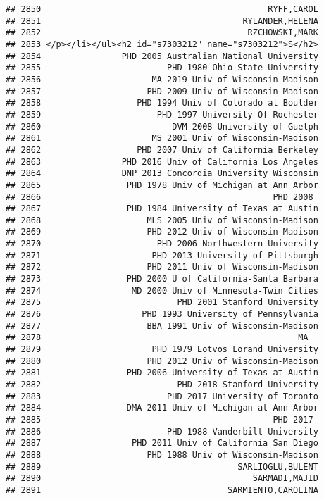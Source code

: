 \documentclass[
]{article}
\begin{document}
\begin{verbatim}
## 2850                                             RYFF,CAROL
## 2851                                        RYLANDER,HELENA
## 2852                                         RZCHOWSKI,MARK
## 2853 </p></li></ul><h2 id="s7303212" name="s7303212">S</h2>
## 2854                PHD 2005 Australian National University
## 2855                         PHD 1980 Ohio State University
## 2856                      MA 2019 Univ of Wisconsin-Madison
## 2857                     PHD 2009 Univ of Wisconsin-Madison
## 2858                   PHD 1994 Univ of Colorado at Boulder
## 2859                       PHD 1997 University Of Rochester
## 2860                          DVM 2008 University of Guelph
## 2861                      MS 2001 Univ of Wisconsin-Madison
## 2862                   PHD 2007 Univ of California Berkeley
## 2863                PHD 2016 Univ of California Los Angeles
## 2864                DNP 2013 Concordia University Wisconsin
## 2865                 PHD 1978 Univ of Michigan at Ann Arbor
## 2866                                              PHD 2008 
## 2867                 PHD 1984 University of Texas at Austin
## 2868                     MLS 2005 Univ of Wisconsin-Madison
## 2869                     PHD 2012 Univ of Wisconsin-Madison
## 2870                       PHD 2006 Northwestern University
## 2871                      PHD 2013 University of Pittsburgh
## 2872                     PHD 2011 Univ of Wisconsin-Madison
## 2873                 PHD 2000 U of California-Santa Barbara
## 2874                  MD 2000 Univ of Minnesota-Twin Cities
## 2875                           PHD 2001 Stanford University
## 2876                    PHD 1993 University of Pennsylvania
## 2877                     BBA 1991 Univ of Wisconsin-Madison
## 2878                                                   MA  
## 2879                      PHD 1979 Eotvos Lorand University
## 2880                     PHD 2012 Univ of Wisconsin-Madison
## 2881                 PHD 2006 University of Texas at Austin
## 2882                           PHD 2018 Stanford University
## 2883                         PHD 2017 University of Toronto
## 2884                 DMA 2011 Univ of Michigan at Ann Arbor
## 2885                                              PHD 2017 
## 2886                         PHD 1988 Vanderbilt University
## 2887                  PHD 2011 Univ of California San Diego
## 2888                     PHD 1988 Univ of Wisconsin-Madison
## 2889                                       SARLIOGLU,BULENT
## 2890                                          SARMADI,MAJID
## 2891                                     SARMIENTO,CAROLINA

\end{verbatim}
\end{document}
